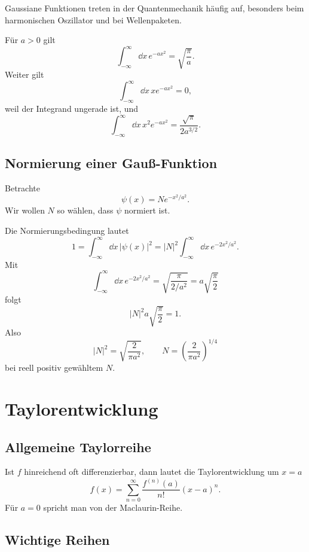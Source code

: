 Gaussiane Funktionen treten in der Quantenmechanik häufig auf, besonders beim harmonischen Oszillator und bei Wellenpaketen.

\begin{formulabox}
Für $a>0$ gilt
\[
    \int_{-\infty}^{\infty}\dd x\,e^{-a x^2}=\sqrt{\frac{\pi}{a}}.
\]
Weiter gilt
\[
    \int_{-\infty}^{\infty}\dd x\,x e^{-a x^2}=0,
\]
weil der Integrand ungerade ist, und
\[
    \int_{-\infty}^{\infty}\dd x\,x^2e^{-a x^2}=\frac{\sqrt\pi}{2a^{3/2}}.
\]
\end{formulabox}

\subsection{Normierung einer Gauß-Funktion}

Betrachte
\[
    \psi(x)=N e^{-x^2/a^2}.
\]
Wir wollen $N$ so wählen, dass $\psi$ normiert ist.

\begin{calculationbox}
Die Normierungsbedingung lautet
\[
    1=\int_{-\infty}^{\infty}\dd x\,|\psi(x)|^2
    =|N|^2\int_{-\infty}^{\infty}\dd x\,e^{-2x^2/a^2}.
\]
Mit
\[
    \int_{-\infty}^{\infty}\dd x\,e^{-2x^2/a^2}
    =\sqrt{\frac{\pi}{2/a^2}}
    =a\sqrt{\frac{\pi}{2}}
\]
folgt
\[
    |N|^2 a\sqrt{\frac{\pi}{2}}=1.
\]
Also
\[
    |N|^2=\sqrt{\frac{2}{\pi a^2}},
    \qquad
    N=\left(\frac{2}{\pi a^2}\right)^{1/4}
\]
bei reell positiv gewähltem $N$.
\end{calculationbox}

\section{Taylorentwicklung}

\subsection{Allgemeine Taylorreihe}

\begin{formulabox}
Ist $f$ hinreichend oft differenzierbar, dann lautet die Taylorentwicklung um $x=a$
\[
    f(x)=\sum_{n=0}^{\infty}\frac{f^{(n)}(a)}{n!}(x-a)^n.
\]
Für $a=0$ spricht man von der Maclaurin-Reihe.
\end{formulabox}

\subsection{Wichtige Reihen}

